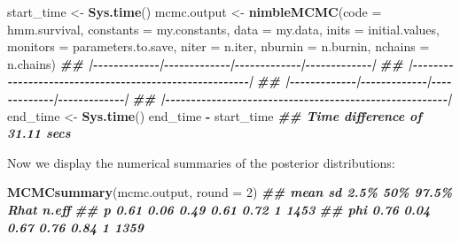 \documentclass[
  12pt,
]{krantz}
\newenvironment{Shaded}{\begin{snugshade}}{\end{snugshade}}
\newcommand{\AttributeTok}[1]{\textcolor[rgb]{0.13,0.29,0.53}{#1}}
\newcommand{\DecValTok}[1]{\textcolor[rgb]{0.00,0.00,0.81}{#1}}
\newcommand{\DocumentationTok}[1]{\textcolor[rgb]{0.56,0.35,0.01}{\textbf{\textit{#1}}}}
\newcommand{\FunctionTok}[1]{\textcolor[rgb]{0.13,0.29,0.53}{\textbf{#1}}}
\newcommand{\NormalTok}[1]{#1}
\newcommand{\OtherTok}[1]{\textcolor[rgb]{0.56,0.35,0.01}{#1}}
\newcommand{\SpecialCharTok}[1]{\textcolor[rgb]{0.81,0.36,0.00}{\textbf{#1}}}
\begin{document}
\begin{Shaded}
\begin{Highlighting}[]
\NormalTok{start\_time }\OtherTok{\textless{}{-}} \FunctionTok{Sys.time}\NormalTok{()}
\NormalTok{mcmc.output }\OtherTok{\textless{}{-}} \FunctionTok{nimbleMCMC}\NormalTok{(}\AttributeTok{code =}\NormalTok{ hmm.survival,}
                          \AttributeTok{constants =}\NormalTok{ my.constants,}
                          \AttributeTok{data =}\NormalTok{ my.data,}
                          \AttributeTok{inits =}\NormalTok{ initial.values,}
                          \AttributeTok{monitors =}\NormalTok{ parameters.to.save,}
                          \AttributeTok{niter =}\NormalTok{ n.iter,}
                          \AttributeTok{nburnin =}\NormalTok{ n.burnin,}
                          \AttributeTok{nchains =}\NormalTok{ n.chains)}
\DocumentationTok{\#\# |{-}{-}{-}{-}{-}{-}{-}{-}{-}{-}{-}{-}{-}|{-}{-}{-}{-}{-}{-}{-}{-}{-}{-}{-}{-}{-}|{-}{-}{-}{-}{-}{-}{-}{-}{-}{-}{-}{-}{-}|{-}{-}{-}{-}{-}{-}{-}{-}{-}{-}{-}{-}{-}|}
\DocumentationTok{\#\# |{-}{-}{-}{-}{-}{-}{-}{-}{-}{-}{-}{-}{-}{-}{-}{-}{-}{-}{-}{-}{-}{-}{-}{-}{-}{-}{-}{-}{-}{-}{-}{-}{-}{-}{-}{-}{-}{-}{-}{-}{-}{-}{-}{-}{-}{-}{-}{-}{-}{-}{-}{-}{-}{-}{-}|}
\DocumentationTok{\#\# |{-}{-}{-}{-}{-}{-}{-}{-}{-}{-}{-}{-}{-}|{-}{-}{-}{-}{-}{-}{-}{-}{-}{-}{-}{-}{-}|{-}{-}{-}{-}{-}{-}{-}{-}{-}{-}{-}{-}{-}|{-}{-}{-}{-}{-}{-}{-}{-}{-}{-}{-}{-}{-}|}
\DocumentationTok{\#\# |{-}{-}{-}{-}{-}{-}{-}{-}{-}{-}{-}{-}{-}{-}{-}{-}{-}{-}{-}{-}{-}{-}{-}{-}{-}{-}{-}{-}{-}{-}{-}{-}{-}{-}{-}{-}{-}{-}{-}{-}{-}{-}{-}{-}{-}{-}{-}{-}{-}{-}{-}{-}{-}{-}{-}|}
\NormalTok{end\_time }\OtherTok{\textless{}{-}} \FunctionTok{Sys.time}\NormalTok{()}
\NormalTok{end\_time }\SpecialCharTok{{-}}\NormalTok{ start\_time}
\DocumentationTok{\#\# Time difference of 31.11 secs}
\end{Highlighting}
\end{Shaded}

Now we display the numerical summaries of the posterior distributions:

\begin{Shaded}
\begin{Highlighting}[]
\FunctionTok{MCMCsummary}\NormalTok{(mcmc.output, }\AttributeTok{round =} \DecValTok{2}\NormalTok{)}
\DocumentationTok{\#\#     mean   sd 2.5\%  50\% 97.5\% Rhat n.eff}
\DocumentationTok{\#\# p   0.61 0.06 0.49 0.61  0.72    1  1453}
\DocumentationTok{\#\# phi 0.76 0.04 0.67 0.76  0.84    1  1359}
\end{Highlighting}
\end{Shaded}
\end{document}
